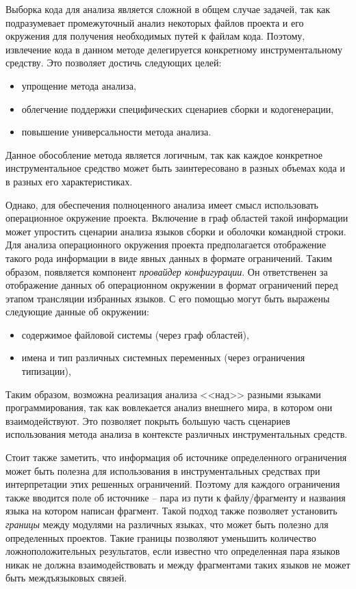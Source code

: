 Выборка кода для анализа является сложной в общем случае задачей, так как подразумевает
промежуточный анализ некоторых файлов проекта и его окружения для получения необходимых
путей к файлам кода. Поэтому, извлечение кода в данном методе делегируется конкретному инструментальному
средству. Это позволяет достичь следующих целей:
\begin{itemize}
    \item упрощение метода анализа,
    \item облегчение поддержки специфических сценариев сборки и кодогенерации,
    \item повышение универсальности метода анализа.
\end{itemize}

Данное обособление метода является логичным, так как каждое конкретное инструментальное
средство может быть заинтересовано в разных объемах кода и в разных его характеристиках.

Однако, для обеспечения полноценного анализа имеет смысл использовать операционное окружение
проекта. Включение в граф областей такой информации может упростить сценарии анализа
языков сборки и оболочки командной строки.
Для анализа операционного окружения проекта предполагается отображение такого рода информации в виде
явных данных в формате ограничений. Таким образом, появляется компонент \textit{провайдер конфигурации}.
Он ответственен за отображение данных об операционном окружении в формат ограничений перед
этапом трансляции избранных языков. С его помощью могут быть выражены следующие данные об окружении:
\begin{itemize}
    \item содержимое файловой системы (через граф областей),
    \item имена и тип различных системных переменных (через ограничения типизации),
\end{itemize}

Таким образом, возможна реализация анализа <<над>> разными языками программирования, так как
 вовлекается анализ внешнего мира, в котором они взаимодействуют. Это позволяет
 покрыть большую часть сценариев использования метода анализа в контексте различных
 инструментальных средств. 

Стоит также заметить, что информация об источнике определенного ограничения может быть полезна для использования
в инструментальных средствах при интерпретации этих решенных ограничений. Поэтому для каждого ограничения также вводится
поле об источнике -- пара из пути к файлу/фрагменту и названия языка на котором написан фрагмент. Такой
подход также позволяет установить \textit{границы} между модулями на различных языках, что может быть полезно
для определенных проектов. Такие границы позволяют уменьшить количество ложноположительных результатов, если
известно что определенная пара языков никак не должна взаимодействовать и между фрагментами таких языков не может быть
междъязыковых связей. 

